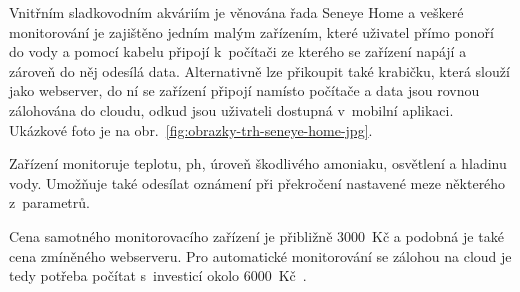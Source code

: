             Vnitřním sladkovodním akváriím je věnována řada Seneye Home a veškeré monitorování je zajištěno jedním malým zařízením, které uživatel přímo ponoří do vody a pomocí kabelu připojí k~počítači ze kterého se zařízení napájí a zároveň do něj odesílá data. Alternativně lze přikoupit také krabičku, která slouží jako webserver, do ní se zařízení připojí namísto počítače a data jsou rovnou zálohována do cloudu, odkud jsou uživateli dostupná v~mobilní aplikaci. Ukázkové foto je na obr.~\ref{fig:obrazky-trh-seneye-home-jpg}.

            Zařízení monitoruje teplotu, \acs{ph}, úroveň škodlivého amoniaku, osvětlení a hladinu vody. Umožňuje také odesílat oznámení při překročení nastavené meze některého z~parametrů.

            Cena samotného monitorovacího zařízení je přibližně \qty{3000}{Kč} a podobná je také cena zmíněného webserveru. Pro automatické monitorování se zálohou na cloud je tedy potřeba počítat s~investicí okolo \qty{6000}{Kč}~\cite{seneye-home}.
            


        